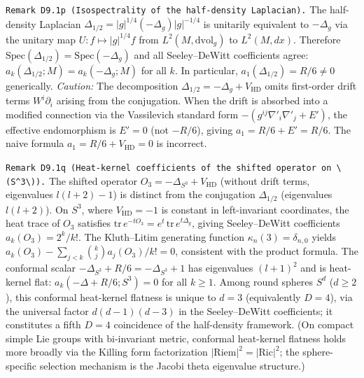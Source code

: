 \documentclass[
]{article}
\begin{document}
\texttt{Remark\ D9.1p\ (Isospectrality\ of\ the\ half-density\ Laplacian).}
The half-density Laplacian
\(\Delta_{1/2}=|g|^{1/4}(-\Delta_g)|g|^{-1/4}\) is unitarily equivalent
to \(-\Delta_g\) via the unitary map \(U:f\mapsto |g|^{1/4}f\) from
\(L^2(M,\mathrm{dvol}_g)\) to \(L^2(M,dx)\). Therefore
\(\mathrm{Spec}(\Delta_{1/2})=\mathrm{Spec}(-\Delta_g)\) and all
Seeley--DeWitt coefficients agree:
\(a_k(\Delta_{1/2};M)=a_k(-\Delta_g;M)\) for all \(k\). In particular,
\(a_1(\Delta_{1/2})=R/6\neq 0\) generically. \emph{Caution:} The
decomposition \(\Delta_{1/2}=-\Delta_g+V_{\mathrm{HD}}\) omits
first-order drift terms \(W^i\partial_i\) arising from the conjugation.
When the drift is absorbed into a modified connection via the
Vassilevich standard form \(-(g^{ij}\nabla'_i\nabla'_j+E')\), the
effective endomorphism is \(E'=0\) (not \(-R/6\)), giving
\(a_1=R/6+E'=R/6\). The naive formula \(a_1=R/6+V_{\mathrm{HD}}=0\) is
incorrect.

\texttt{Remark\ D9.1q\ (Heat-kernel\ coefficients\ of\ the\ shifted\ operator\ on\ \textbackslash{}(S\^{}3\textbackslash{})).}
The shifted operator \(O_3=-\Delta_{S^3}+V_{\mathrm{HD}}\) (without
drift terms, eigenvalues \(l(l{+}2)-1\)) is distinct from the
conjugation \(\Delta_{1/2}\) (eigenvalues \(l(l{+}2)\)). On \(S^3\),
where \(V_{\mathrm{HD}}=-1\) is constant in left-invariant coordinates,
the heat trace of \(O_3\) satisfies
\(\mathrm{tr}\,e^{-tO_3}=e^t\,\mathrm{tr}\,e^{t\Delta_g}\), giving
Seeley--DeWitt coefficients \(a_k(O_3)=2^k/k!\). The Kluth--Litim
generating function \(\kappa_n(3)=\delta_{n,0}\) yields
\(a_k(O_3)-\sum_{j<k}\binom{k}{j}a_j(O_3)/k!=0\), consistent with the
product formula. The conformal scalar
\(-\Delta_{S^3}+R/6=-\Delta_{S^3}+1\) has eigenvalues \((l{+}1)^2\) and
is heat-kernel flat: \(a_k(-\Delta+R/6;S^3)=0\) for all \(k\ge1\). Among
round spheres \(S^d\) (\(d\ge2\)), this conformal heat-kernel flatness
is unique to \(d=3\) (equivalently \(D=4\)), via the universal factor
\(d(d{-}1)(d{-}3)\) in the Seeley--DeWitt coefficients; it constitutes a
fifth \(D=4\) coincidence of the half-density framework. (On compact
simple Lie groups with bi-invariant metric, conformal heat-kernel
flatness holds more broadly via the Killing form factorization
\(|{\mathrm{Riem}}|^2=|{\mathrm{Ric}}|^2\); the sphere-specific
selection mechanism is the Jacobi theta eigenvalue structure.)
\end{document}

